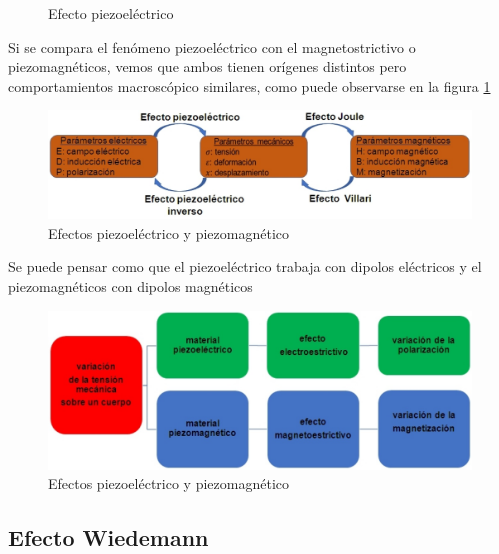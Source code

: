 \begin{figure}[H]
\begin{minipage}[b]{0.47\textwidth}
  \end{minipage}
	\caption{\protect\centering Efecto piezoeléctrico} 
	\label{fig:efectoPiezoelectrico}
\end{figure}

Si se compara el fenómeno piezoeléctrico con el magnetostrictivo o piezomagnéticos, vemos que ambos tienen orígenes distintos pero comportamientos macroscópico similares, como puede observarse en la figura \ref{fig:efectoPiezoelectrico}

\begin{figure}[H]
    \centering
    \includegraphics[width=1.1\textwidth]{./Figures/piezoMagneto}
	\caption{Efectos piezoeléctrico y piezomagnético}
	\label{fig:piezoMagneto}
\end{figure}

Se puede pensar como que el piezoeléctrico trabaja con dipolos eléctricos y el piezomagnéticos con dipolos magnéticos

\begin{figure}[H]
    \centering
    \includegraphics[width=1.0\textwidth]{./Figures/piezoMagneto2}
	\caption{Efectos piezoeléctrico y piezomagnético}
	\label{fig:piezoMagneto2}
\end{figure}

\subsection{Efecto Wiedemann}

